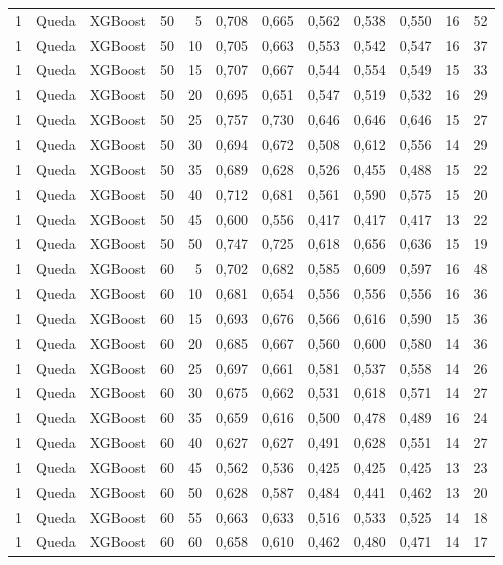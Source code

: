 \begin{longtable}{@{}rllrrrrrrrrr@{}}
1 & Queda & XGBoost & 50 & 5 & 0,708 & 0,665 & 0,562 & 0,538 & 0,550 & 16 & 52 \\
1 & Queda & XGBoost & 50 & 10 & 0,705 & 0,663 & 0,553 & 0,542 & 0,547 & 16 & 37 \\
1 & Queda & XGBoost & 50 & 15 & 0,707 & 0,667 & 0,544 & 0,554 & 0,549 & 15 & 33 \\
1 & Queda & XGBoost & 50 & 20 & 0,695 & 0,651 & 0,547 & 0,519 & 0,532 & 16 & 29 \\
1 & Queda & XGBoost & 50 & 25 & 0,757 & 0,730 & 0,646 & 0,646 & 0,646 & 15 & 27 \\
1 & Queda & XGBoost & 50 & 30 & 0,694 & 0,672 & 0,508 & 0,612 & 0,556 & 14 & 29 \\
1 & Queda & XGBoost & 50 & 35 & 0,689 & 0,628 & 0,526 & 0,455 & 0,488 & 15 & 22 \\
1 & Queda & XGBoost & 50 & 40 & 0,712 & 0,681 & 0,561 & 0,590 & 0,575 & 15 & 20 \\
1 & Queda & XGBoost & 50 & 45 & 0,600 & 0,556 & 0,417 & 0,417 & 0,417 & 13 & 22 \\
1 & Queda & XGBoost & 50 & 50 & 0,747 & 0,725 & 0,618 & 0,656 & 0,636 & 15 & 19 \\
1 & Queda & XGBoost & 60 & 5 & 0,702 & 0,682 & 0,585 & 0,609 & 0,597 & 16 & 48 \\
1 & Queda & XGBoost & 60 & 10 & 0,681 & 0,654 & 0,556 & 0,556 & 0,556 & 16 & 36 \\
1 & Queda & XGBoost & 60 & 15 & 0,693 & 0,676 & 0,566 & 0,616 & 0,590 & 15 & 36 \\
1 & Queda & XGBoost & 60 & 20 & 0,685 & 0,667 & 0,560 & 0,600 & 0,580 & 14 & 36 \\
1 & Queda & XGBoost & 60 & 25 & 0,697 & 0,661 & 0,581 & 0,537 & 0,558 & 14 & 26 \\
1 & Queda & XGBoost & 60 & 30 & 0,675 & 0,662 & 0,531 & 0,618 & 0,571 & 14 & 27 \\
1 & Queda & XGBoost & 60 & 35 & 0,659 & 0,616 & 0,500 & 0,478 & 0,489 & 16 & 24 \\
1 & Queda & XGBoost & 60 & 40 & 0,627 & 0,627 & 0,491 & 0,628 & 0,551 & 14 & 27 \\
1 & Queda & XGBoost & 60 & 45 & 0,562 & 0,536 & 0,425 & 0,425 & 0,425 & 13 & 23 \\
1 & Queda & XGBoost & 60 & 50 & 0,628 & 0,587 & 0,484 & 0,441 & 0,462 & 13 & 20 \\
1 & Queda & XGBoost & 60 & 55 & 0,663 & 0,633 & 0,516 & 0,533 & 0,525 & 14 & 18 \\
1 & Queda & XGBoost & 60 & 60 & 0,658 & 0,610 & 0,462 & 0,480 & 0,471 & 14 & 17 \\

\end{longtable}
